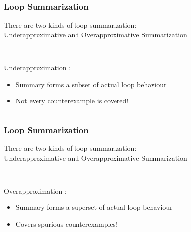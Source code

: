 \begin{frame}[t]
	\frametitle{Loop Summarization}
	\begin{center}
		There are two kinds of loop summarization: \\
		\onslide<+-> \color{emblue}Underapproximative \color{black} and \color{emblue}Overapproximative \color{black} Summarization
		\begin{columns}[t]
			\begin{column}{0.35\textwidth}
				\vspace*{0.5cm} \\
				\onslide<+-> \color{emblue} Underapproximation \color{black}:
				\begin{itemize}
					\onslide<+-> \item Summary forms a subset of actual loop behaviour
					\item Not every counterexample is covered!
				\end{itemize}
			\end{column}
			\begin{column}{0.5\textwidth}
				\vspace*{0.5cm}
				\resizebox{\textwidth}{!}{}
			\end{column}
		\end{columns}
	\end{center}
\end{frame}

\begin{frame}[t]
	\frametitle{Loop Summarization}
	\begin{center}
		There are two kinds of loop summarization: \\
		\onslide<+-> \color{emblue}Underapproximative \color{black} and \color{emblue}Overapproximative \color{black} Summarization
		\begin{columns}[t]
			\begin{column}{0.35\textwidth}
				\vspace*{0.5cm} \\
				\onslide<+-> \color{emblue} Overapproximation \color{black}:
				\begin{itemize}
					\onslide<+-> \item Summary forms a superset of actual loop behaviour
					\onslide<+-> \item Covers spurious counterexamples!
				\end{itemize}
			\end{column}
			\begin{column}{0.5\textwidth}
				\vspace*{0.5cm}
				\resizebox{\textwidth}{!}{}
			\end{column}
		\end{columns}
	\end{center}
\end{frame}